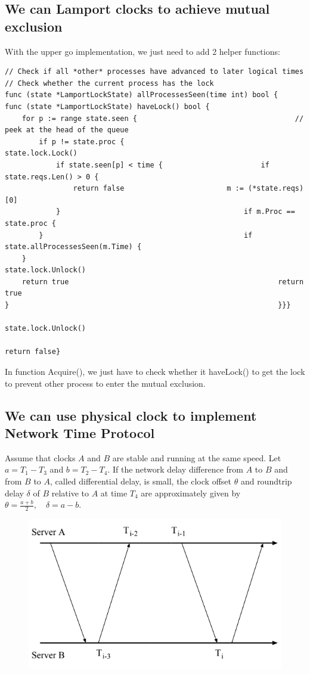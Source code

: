 \documentclass[acmlarge]{acmart}
\begin{document}
\subsection{We can Lamport clocks to achieve mutual exclusion}
With the upper go implementation, we just need to add 2 helper functions:
\begin{lstlisting}
// Check if all *other* processes have advanced to later logical times // Check whether the current process has the lock     
func (state *LamportLockState) allProcessesSeen(time int) bool {       func (state *LamportLockState) haveLock() bool {     
	for p := range state.seen {                                 	// peek at the head of the queue                           
		if p != state.proc {                                  	state.lock.Lock()                       
			if state.seen[p] < time {                     	if state.reqs.Len() > 0 {                             
				return false                      	m := (*state.reqs)[0]        
			}                                   		if m.Proc == state.proc {     
		}                                   			if state.allProcessesSeen(m.Time) {
	}                                  	                    	state.lock.Unlock() 
	return true                        	                    	return true               
}                                                      			}}}
                                                               		state.lock.Unlock()
                                                               		return false}
\end{lstlisting}

In function Acquire(), we just have to check whether it haveLock() to get the lock to prevent other process to enter the mutual exclusion.
\subsection{We can use physical clock to implement Network Time Protocol}
Assume that clocks $A$ and $B$ are stable and running at the same speed. Let $a=T_{1}-T_{3}$ and $b=T_{2}-T_{4}$. If the network delay difference from $A$ to $B$ and from $B$ to $A$, called differential delay, is small, the clock offset $\theta$ and roundtrip delay $\delta$ of $B$ relative to $A$ at time $T_{4}$ are approximately given by $\theta=\frac{a+b}{2}, \quad \delta=a-b$.
\begin{figure}[h]
  \centering
  \includegraphics[width=0.3\linewidth]{ntp.png}
  \caption{}
\end{figure}
\end{document}
